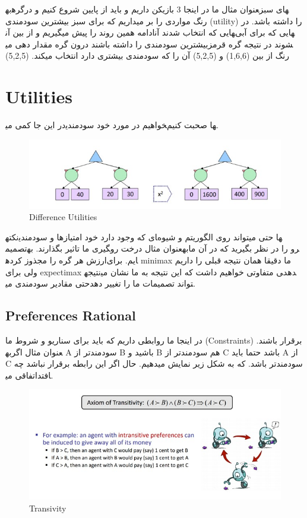 به‎عنوان مثال ما در اینجا 3 بازیکن داریم و باید از پایین شروع کنیم و درگره‎های سبز رنگ مواردی را بر میداریم که برای سبز بیشترین سودمندی (utility) را داشته باشد. در ادامه همین روند را پیش میگیریم و از بین آن‎هایی که انتخاب شدند آن‎هایی که برای آبی بیشترین سودمندی را داشته باشند درون گره مقدار دهی می‎شوند در نتیجه گره قرمز رنگ از بین (1,6,6) و (5,2,5) آن را که سودمندی بیشتری دارد انتخاب میکند. (5,2,5) 

\section{Utilities}
در این جا کمی می‎خواهیم در مورد خود سودمندی‎ها صحبت کنیم.

\begin{figure}[h!]
    \centering
    \includegraphics[width=0.8\linewidth]{images/utilities01.jpg}
    \caption{Difference Utilities}
\end{figure}

نکته‎ای که وجود دارد خود امتیازها و سودمندی‎ها حتی میتواند روی الگوریتم و شیوه تصمیم‎گیری ما تاثیر بگذارند. به‎عنوان مثال درخت رو‎به‎رو را در نظر بگیرید که در آن ما ارزش هر گره را مجذوز کرده‎ایم. برای minimax ما دقیقا همان نتیجه قبلی را داریم ولی برای expectimax نتیجه‎ی متفاوتی خواهیم داشت که این نتیجه به ما نشان می‎دهد حتی مقادیر سودمندی می‎تواند تصمیمات ما را تغییر دهد.


\subsection{Preferences Rational}
در اینجا ما روابطی داریم که باید برای سناریو و شروط ما (Constraints) برقرار باشند. به‎عنوان مثال اگر A سودمندتر از B باشید و B هم سودمندتر از C باشد حتما باید A از C سودمندتر باشد. که به شکل زیر نمایش میدهیم. حال اگر این رابطه برقرار نباشد چه اتفاقی می‎افتد.


\begin{figure}[h!]
    \centering
    \includegraphics[width=0.8\linewidth]{images/transivity.jpg}
    \caption{Transivity}
\end{figure}


